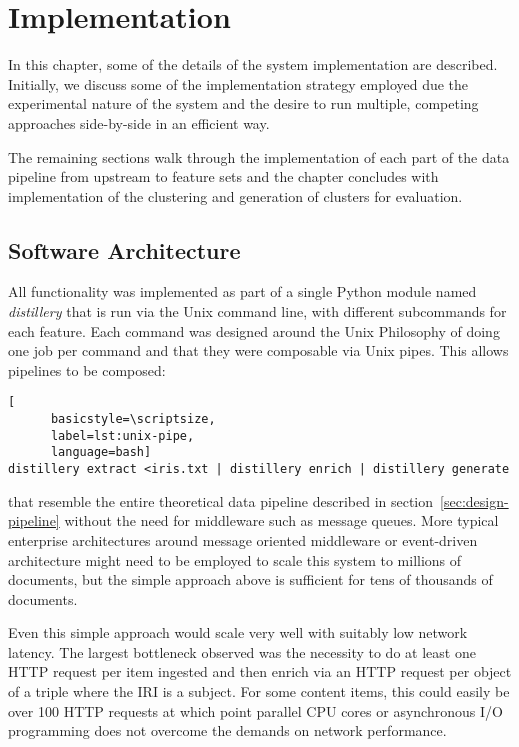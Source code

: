 \chapter{Implementation}
\label{chp:implementation}

In this chapter, some of the details of the system implementation
are described. Initially, we discuss some of the implementation
strategy employed due the experimental nature of the system and the
desire to run multiple, competing approaches side-by-side in an
efficient way.

The remaining sections walk through the implementation of each part
of the data pipeline from upstream to feature sets and the chapter
concludes with implementation of the clustering and generation of
clusters for evaluation.

\section{Software Architecture}

All functionality was implemented as part of a single Python module
named \emph{distillery}
that is run via the Unix command line, with different subcommands for
each feature. Each command was designed around the
Unix Philosophy\cite{raymond2003art} of doing one job per command and
that they were composable via Unix pipes. This allows pipelines to
be composed:

\begin{centering}
  \begin{lstlisting}[
      basicstyle=\scriptsize,
      label=lst:unix-pipe,
      language=bash]
distillery extract <iris.txt | distillery enrich | distillery generate
  \end{lstlisting}
\end{centering}

\noindent that resemble the entire theoretical data pipeline described
in section~\ref{sec:design-pipeline} without the need for middleware
such as message queues. More typical enterprise architectures around
message oriented middleware or event-driven architecture might need
to be employed to scale this system to millions of documents, but
the simple approach above is sufficient for tens of thousands of
documents.

Even this simple approach would scale very well with suitably low
network latency. The largest bottleneck observed was the necessity
to do at least one HTTP request per item ingested and then enrich
via an HTTP request per object of a triple where the IRI is a subject.
For some content items, this could easily be over 100 HTTP requests at
which point parallel CPU cores or asynchronous I/O programming does
not overcome the demands on network performance.

